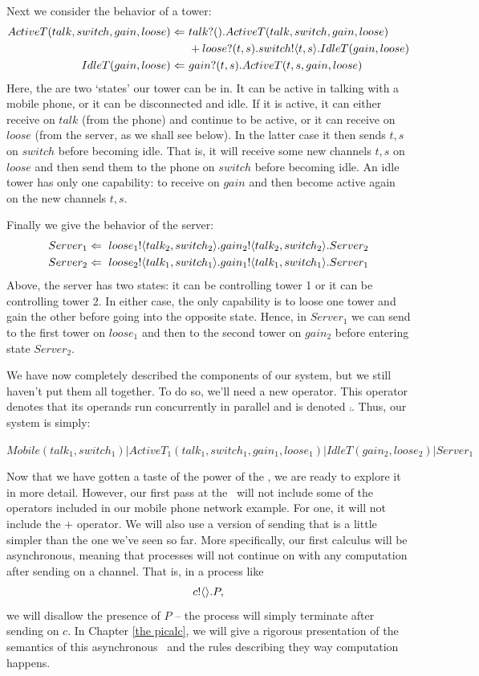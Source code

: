 	Next we consider the behavior of a tower:
	\begin{align*}
		ActiveT(talk,switch,gain,loose) \Leftarrow\  & {talk}?({}).ActiveT(talk,switch,gain,loose) \\  
		 & +{loose}?({t,s}).{switch}!\langle{t,s}\rangle.IdleT(gain, loose)\\
		IdleT(gain,loose) \Leftarrow\  & {gain}?({t,s}).ActiveT(t,s,gain,loose)\\
	\end{align*}
Here, the are two `states' our tower can be in.  It can be active in talking with a mobile phone, or it can be disconnected and idle.  If it is active, it can either receive on $talk$ (from the phone) and continue to be active, or it can receive on $loose$ (from the server, as we shall see below).  In the latter case it then sends $t,s$ on $switch$ before becoming idle.  That is, it will receive some new channels $t,s$ on $loose$ and then send them to the phone on $switch$ before becoming idle.  An idle tower has only one capability: to receive on $gain$ and then become active again on the new channels $t,s$.

Finally we give the behavior of the server:
\begin{align*}
	Server_1 \Leftarrow\  {loose_1}!\langle{talk_2,switch_2}\rangle. {gain_2}!\langle{talk_2,switch_2}\rangle. Server_2\\
	Server_2 \Leftarrow\  {loose_2}!\langle{talk_1,switch_1}\rangle. {gain_1}!\langle{talk_1,switch_1}\rangle. Server_1
\end{align*}
Above, the server has two states: it can be controlling tower 1 or it can be controlling tower 2.  In either case, the only capability is to loose one tower and gain the other before going into the opposite state.  Hence, in $Server_1$ we can send to the first tower on $loose_1$ and then to the second tower on $gain_2$ before entering state $Server_2$.

We have now completely described the components of our system, but we still haven't put them all together.  To do so, we'll need a new operator.  This operator denotes that its operands run concurrently in parallel and is denoted $\comp$.  Thus, our system is simply:
\begin{center}
	\small{$\textstyle Mobile(talk_1,switch_1)|ActiveT_1(talk_1,switch_1,gain_1,loose_1)|IdleT(gain_2,loose_2)|Server_1$}
\end{center}

	Now that we have gotten a taste of the power of the \picalc, we are ready to explore it in more detail.  However, our first pass at the \picalc\ will not include some of the operators included in our mobile phone network example.  For one, it will not include the $+$ operator.  We will also use a version of sending that is a little simpler than the one we've seen so far.  More specifically, our first calculus will be asynchronous, meaning that processes will not continue on with any computation after sending on a channel.  That is, in a process like
\[
	{c}!\langle{}\rangle.P,
\]
we will disallow the presence of $P$ -- the process will simply terminate after sending on $c$.  In Chapter \ref{the picalc}, we will give a rigorous presentation of the semantics of this asynchronous \picalc\ and the rules describing they way computation happens.

